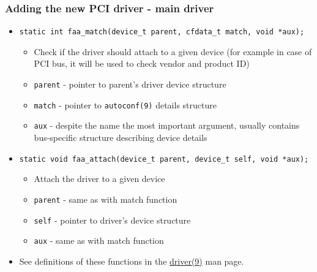 \documentclass[dvipsnames,table]{beamer}
\begin{document}
\begin{frame}
\frametitle{Adding the new PCI driver - main driver}
\begin{itemize}
	\item {\tt static int faa\_match(device\_t parent, cfdata\_t match, void *aux);}	
	\begin{itemize}
		\item Check if the driver should attach to a given device (for example in case of PCI bus, it will be used to check vendor and product ID)
		\item {\tt parent} - pointer to parent's driver device structure
		\item {\tt match} - pointer to {\tt autoconf(9)} details structure
		\item {\tt aux} - despite the name the most important argument, usually contains bus-specific structure describing device details
	\end{itemize}
	\item {\tt static void faa\_attach(device\_t parent, device\_t self, void *aux);}
	\begin{itemize}
		\item Attach the driver to a given device
		\item {\tt parent} - same as with match function
		\item {\tt self} - pointer to driver's device structure
		\item {\tt aux} - same as with match function
	\end{itemize}

	\item See definitions of these functions in the \href{http://netbsd.gw.com/cgi-bin/man-cgi?driver+9+NetBSD-current}{driver(9)} man page.
\end{itemize}
\end{frame}
\end{document}
